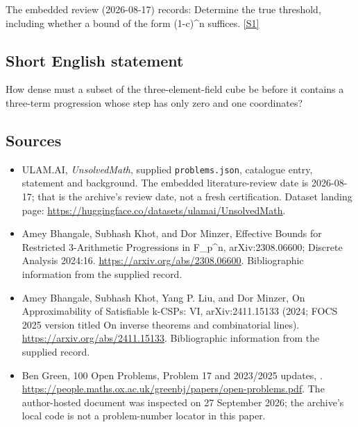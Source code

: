 \documentclass[11pt,a4paper]{article}
\newcommand{\sref}[2]{\hyperlink{source:#1:#2}{[S#2]}}
\begin{document}
The embedded review (2026-08-17) records: Determine the true threshold, including whether a bound of the form (1-c)\textasciicircum{}n suffices. \sref{statement}{1}

\subsection{Short English statement}

How dense must a subset of the three-element-field cube be before it contains a three-term progression whose step has only zero and one coordinates?

\subsection{Sources}

{\small

\begin{itemize}

\item[\hypertarget{source:statement:1}{S1}] ULAM.AI, \emph{UnsolvedMath}, supplied \texttt{problems.json}, catalogue entry, statement and background. The embedded literature-review date is 2026-08-17; that is the archive’s review date, not a fresh certification. Dataset landing page: \url{https://huggingface.co/datasets/ulamai/UnsolvedMath}.

\item[\hypertarget{source:statement:2}{S2}] Amey Bhangale, Subhash Khot, and Dor Minzer, Effective Bounds for Restricted 3-Arithmetic Progressions in F\_p\textasciicircum{}n, arXiv:2308.06600; Discrete Analysis 2024:16. \url{https://arxiv.org/abs/2308.06600}. Bibliographic information from the supplied record.

\item[\hypertarget{source:statement:3}{S3}] Amey Bhangale, Subhash Khot, Yang P. Liu, and Dor Minzer, On Approximability of Satisfiable k-CSPs: VI, arXiv:2411.15133 (2024; FOCS 2025 version titled On inverse theorems and combinatorial lines). \url{https://arxiv.org/abs/2411.15133}. Bibliographic information from the supplied record.

\item[\hypertarget{source:statement:4}{S4}] Ben Green, 100 Open Problems, Problem 17 and 2023/2025 updates, . \url{https://people.maths.ox.ac.uk/greenbj/papers/open-problems.pdf}. The author-hosted document was inspected on 27 September 2026; the archive’s local code is not a problem-number locator in this paper.

\end{itemize}

}

\label{end:statement}
\end{document}
